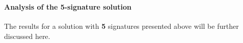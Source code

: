 \documentclass[11pt]{article}
\begin{document}
    \begin{center}
    \end{center}
    { \hspace*{\fill} \\}

    \begin{Verbatim}[commandchars=\\\{\}]

    \end{Verbatim}

    \begin{center}
    \end{center}
    { \hspace*{\fill} \\}

    \begin{center}
    \end{center}
    { \hspace*{\fill} \\}

    \begin{Verbatim}[commandchars=\\\{\}]

    \end{Verbatim}

    \begin{center}
    \end{center}
    { \hspace*{\fill} \\}

    \begin{Verbatim}[commandchars=\\\{\}]

    \end{Verbatim}

    \hypertarget{analysis-of-the-5-signature-solution}{%
\paragraph{Analysis of the 5-signature
solution}\label{analysis-of-the-5-signature-solution}}

The results for a solution with \textbf{5} signatures presented above
will be further discussed here.
\end{document}
